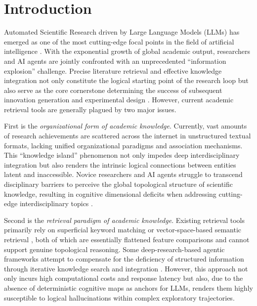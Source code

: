 \documentclass{llmxive}
\begin{document}
\section{Introduction}
\vspace{-0.3em}
\label{sec:intro}

Automated Scientific Research driven by Large Language Models (LLMs) has emerged as one of the most cutting-edge focal points in the field of artificial intelligence \citep{ai4research-survey,ai-scientist,omniscientist}.
With the exponential growth of global academic output, researchers and AI agents are jointly confronted with an unprecedented ``information explosion'' challenge.
Precise literature retrieval and effective knowledge integration not only constitute the logical starting point of the research loop but also serve as the core cornerstone determining the success of subsequent innovation generation and experimental design \citep{innoeval,scholareval,opennovelty,ai-researcher}.
However, current academic retrieval tools are generally plagued by two major issues.

First is the \textit{organizational form of academic knowledge}.
Currently, vast amounts of research achievements are scattered across the internet in unstructured textual formats, lacking unified organizational paradigms and association mechanisms.
This ``knowledge island'' phenomenon not only impedes deep interdisciplinary integration but also renders the intrinsic logical connections between entities latent and inaccessible.
Novice researchers and AI agents struggle to transcend disciplinary barriers to perceive the global topological structure of scientific knowledge, resulting in cognitive dimensional deficits when addressing cutting-edge interdisciplinary topics \citep{scikg}.

Second is the \textit{retrieval paradigm of academic knowledge}.
Existing retrieval tools primarily rely on superficial keyword matching or vector-space-based semantic retrieval \citep{scholareval,innoeval,ai-researcher,automind}, both of which are essentially flattened feature comparisons and cannot support genuine topological reasoning.
Some deep-research-based agentic frameworks attempt to compensate for the deficiency of structured information through iterative knowledge search and integration \citep{wispaper,deepxiv,alphaxiv,opensholar}.
However, this approach not only incurs high computational costs and response latency but also, due to the absence of deterministic cognitive maps as anchors for LLMs, renders them highly susceptible to logical hallucinations within complex exploratory trajectories.
\end{document}
